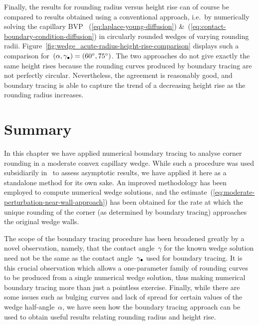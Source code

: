 \begin{figure}
\end{figure}

Finally, the results for rounding radius versus height rise
can of course be compared
to results obtained using a conventional approach,
i.e.~by numerically solving the capillary BVP~%
  (\ref{eq:laplace-young-diffusion})
\&~(\ref{eq:contact-boundary-condition-diffusion})
in circularly rounded wedges of varying rounding radii.
Figure~\ref{fig:wedge_acute-radius-height-rise-comparison}
displays such a comparison
for~$(\alpha, \gamma_\bullet) = (\SI{60}{\degree}, \SI{75}{\degree})$.
The two approaches do not give exactly the same height rises
because the rounding curves produced by boundary tracing
are not perfectly circular.
Nevertheless, the agreement is reasonably good,
and boundary tracing is able to capture
the trend of a decreasing height rise as the rounding radius increases.

\section{Summary}
\label{sec:moderate.summary}

In this chapter
we have applied numerical boundary tracing to analyse corner rounding
in a moderate convex capillary wedge.
While such a procedure was used subsidiarily
in~\cite{li-2017-thesis-rounding-capillary-wedge}
to assess asymptotic results,
we have applied it here as a standalone method for its own sake.
An improved methodology has been employed
to compute numerical wedge solutions,
and the estimate~(\ref{eq:moderate-perturbation-near-wall-approach})
has been obtained
for the rate at which the unique rounding of the corner
(as determined by boundary tracing)
approaches the original wedge walls.

The scope of the boundary tracing procedure has been broadened greatly
by a novel observation,
namely, that the contact angle~$\gamma$ for the known wedge solution
need not be the same as the contact angle~$\gamma_\bullet$
used for boundary tracing.
It is this crucial observation which allows
a one-parameter family of rounding curves to be produced
from a single numerical wedge solution,
thus making numerical boundary tracing
more than just a pointless exercise.
Finally, while there are some issues such as bulging curves and lack of spread
for certain values of the wedge half-angle~$\alpha$,
we have seen how the boundary tracing approach can be used
to obtain useful results relating rounding radius and height rise.

